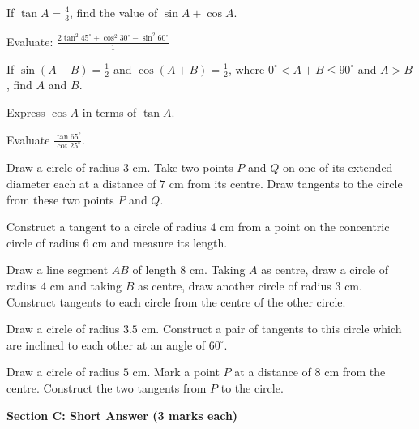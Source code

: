 \documentclass[12pt,a4paper]{exam}
\begin{document}
\begin{questions}
\question[2] If $\tan A = \frac{4}{3}$, find the value of $\sin A + \cos A$.
\vspace{0.15cm}

\question[2] Evaluate: $\frac{2 \tan^2 45^\circ + \cos^2 30^\circ - \sin^2 60^\circ}{1}$
\vspace{0.15cm}

\question[2] If $\sin(A - B) = \frac{1}{2}$ and $\cos(A + B) = \frac{1}{2}$, where $0^\circ < A + B \le 90^\circ$ and $A > B$, find $A$ and $B$.
\vspace{0.15cm}

\question[2] Express $\cos A$ in terms of $\tan A$.
\vspace{0.15cm}

\question[2] Evaluate $\frac{\tan 65^\circ}{\cot 25^\circ}$.
\vspace{0.15cm}

\question[2] Draw a circle of radius $3 \text{ cm}$. Take two points $P$ and $Q$ on one of its extended diameter each at a distance of $7 \text{ cm}$ from its centre. Draw tangents to the circle from these two points $P$ and $Q$.
\vspace{0.15cm}

\question[2] Construct a tangent to a circle of radius $4 \text{ cm}$ from a point on the concentric circle of radius $6 \text{ cm}$ and measure its length.
\vspace{0.15cm}

\question[2] Draw a line segment $AB$ of length $8 \text{ cm}$. Taking $A$ as centre, draw a circle of radius $4 \text{ cm}$ and taking $B$ as centre, draw another circle of radius $3 \text{ cm}$. Construct tangents to each circle from the centre of the other circle.
\vspace{0.15cm}

\question[2] Draw a circle of radius $3.5 \text{ cm}$. Construct a pair of tangents to this circle which are inclined to each other at an angle of $60^\circ$.
\vspace{0.15cm}

\question[2] Draw a circle of radius $5 \text{ cm}$. Mark a point $P$ at a distance of $8 \text{ cm}$ from the centre. Construct the two tangents from $P$ to the circle.
\vspace{0.15cm}

\end{questions}
\bigskip
\noindent\textbf{\large Section C: Short Answer (3 marks each)}
\end{document}
